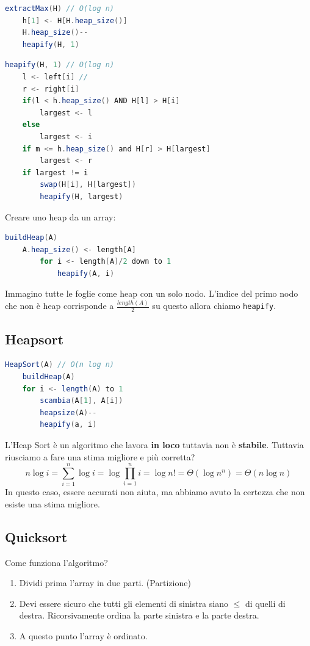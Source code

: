 \documentclass[a4paper]{article}
\begin{document}
\begin{lstlisting}[language=Scala]
extractMax(H) // O(log n)
    h[1] <- H[H.heap_size()]
    H.heap_size()--
    heapify(H, 1)
\end{lstlisting}

\begin{lstlisting}[language=Scala]
heapify(H, 1) // O(log n)
    l <- left[i] // 
    r <- right[i] 
    if(l < h.heap_size() AND H[l] > H[i]
        largest <- l
    else
        largest <- i
    if m <= h.heap_size() and H[r] > H[largest]
        largest <- r
    if largest != i
        swap(H[i], H[largest])
        heapify(H, largest)
\end{lstlisting}
Creare uno heap da un array:
\begin{lstlisting}[language=Scala]
buildHeap(A) 
    A.heap_size() <- length[A]
        for i <- length[A]/2 down to 1
            heapify(A, i)
\end{lstlisting}
Immagino tutte le foglie come heap con un solo nodo. L'indice del primo nodo che non è heap corrisponde a $\frac{length(A)}{2}$ su questo allora chiamo \texttt{heapify}.

\pagebreak

\subsection{Heapsort}
\begin{lstlisting}[language=Scala]
HeapSort(A) // O(n log n)
    buildHeap(A)
    for i <- length(A) to 1
        scambia(A[1], A[i])
        heapsize(A)--
        heapify(a, i)
\end{lstlisting}
L'Heap Sort è un algoritmo che lavora \textbf{in loco} tuttavia non è \textbf{stabile}. Tuttavia riusciamo a fare una stima migliore e più corretta? 
\[n \log i = \sum_{i=1}^n \log i = \log \prod_{i=1}^n i = \log n! = \Theta(\log n^n) = \Theta(n \log n)\]
In questo caso, essere accurati non aiuta, ma abbiamo avuto la certezza che non esiste una stima migliore.
\subsection{Quicksort}
Come funziona l'algoritmo?
\begin{enumerate}
    \item Dividi prima l'array in due parti. (Partizione)
    \item  Devi essere sicuro che tutti gli elementi di sinistra siano $\le$ di quelli di destra. Ricorsivamente ordina la parte sinistra e la parte destra.
    \item A questo punto l'array è ordinato.
\end{enumerate}
\end{document}
